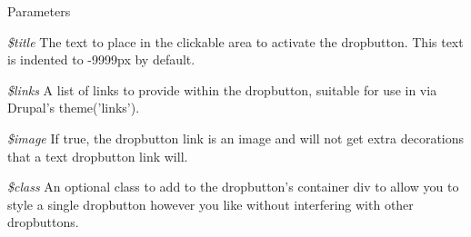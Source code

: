 \begin{DoxyParams}{Parameters}
\item[{\em \$title}]The text to place in the clickable area to activate the dropbutton. This text is indented to -\/9999px by default. \item[{\em \$links}]A list of links to provide within the dropbutton, suitable for use in via Drupal's theme('links'). \item[{\em \$image}]If true, the dropbutton link is an image and will not get extra decorations that a text dropbutton link will. \item[{\em \$class}]An optional class to add to the dropbutton's container div to allow you to style a single dropbutton however you like without interfering with other dropbuttons. \end{DoxyParams}
